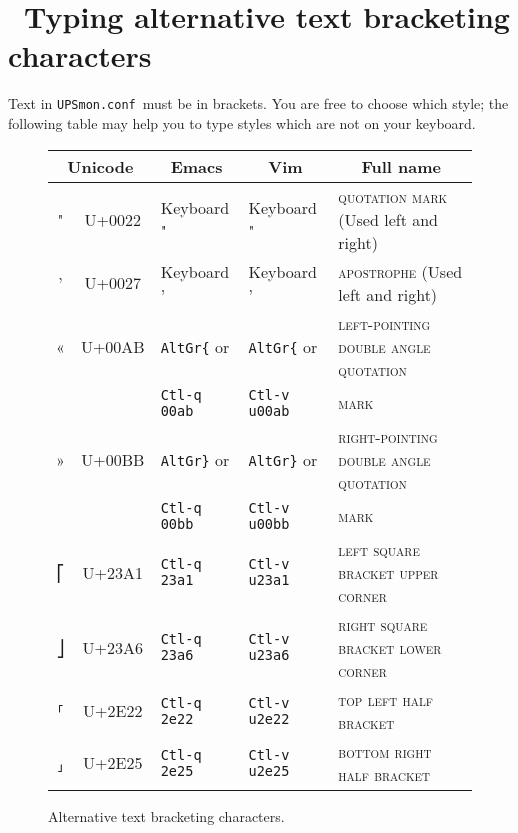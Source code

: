 \documentclass[12pt]{article}
\newlength{\headersep}\setlength{\headersep}{3mm}
\newcommand{\Hsep}{\hspace{\headersep}}
\newcommand{\newcolumn}{\vfill\eject}
\newcommand{\UPSmonconf}{\textcolor{UPSMONCOLOUR}{\texttt{UPSmon.conf}}}
\begin{document}

\section{\Hsep\ Typing alternative text bracketing characters}\label{section:brackets}

Text in \UPSmonconf\ must be in brackets.  You are free to choose which style;
the following table may help you to type styles which are not on your keyboard.

\begin{figure}[ht]
\begin{center}
\begin{tabular}{|c|c|p{0.15\LinePrinterwidth}|p{0.17\LinePrinterwidth}|p{0.6\LinePrinterwidth}|}
\hline
\multicolumn{2}{|c|}{Unicode} & \multicolumn{1}{|c|}{Emacs}
                                 & \multicolumn{1}{|c|}{Vim} & \multicolumn{1}{|c|}{Full name} \\ \hline\hline
" & U+0022 & Keyboard "          & Keyboard "           & \textsc{quotation mark} (Used left and right) \\ \hline
' & U+0027 & Keyboard '          & Keyboard '           & \textsc{apostrophe} (Used left and right) \\ \hline
« & U+00AB & \texttt{AltGr\{} or & \texttt{AltGr\{} or  & \textsc{left-pointing double angle quotation} \\
  &        & \texttt{Ctl-q 00ab} & \texttt{Ctl-v u00ab} & \textsc{mark} \\ \hline
» & U+00BB & \texttt{AltGr\}} or & \texttt{AltGr\}} or  & \textsc{right-pointing double angle quotation} \\
  &        & \texttt{Ctl-q 00bb} & \texttt{Ctl-v u00bb} & \textsc{mark} \\ \hline
⎡ & U+23A1 & \texttt{Ctl-q 23a1} & \texttt{Ctl-v u23a1} & \textsc{left square bracket upper corner} \\ \hline
⎦ & U+23A6 & \texttt{Ctl-q 23a6} & \texttt{Ctl-v u23a6} & \textsc{right square bracket lower corner} \\ \hline
⸢ & U+2E22 & \texttt{Ctl-q 2e22} & \texttt{Ctl-v u2e22} & \textsc{top left half bracket} \\ \hline
⸥ & U+2E25 & \texttt{Ctl-q 2e25} & \texttt{Ctl-v u2e25} & \textsc{bottom right half bracket} \\ \hline
\end{tabular}
\caption{Alternative text bracketing characters.\label{fig:brackets}}
\end{center}
\end{figure}
\end{document}
